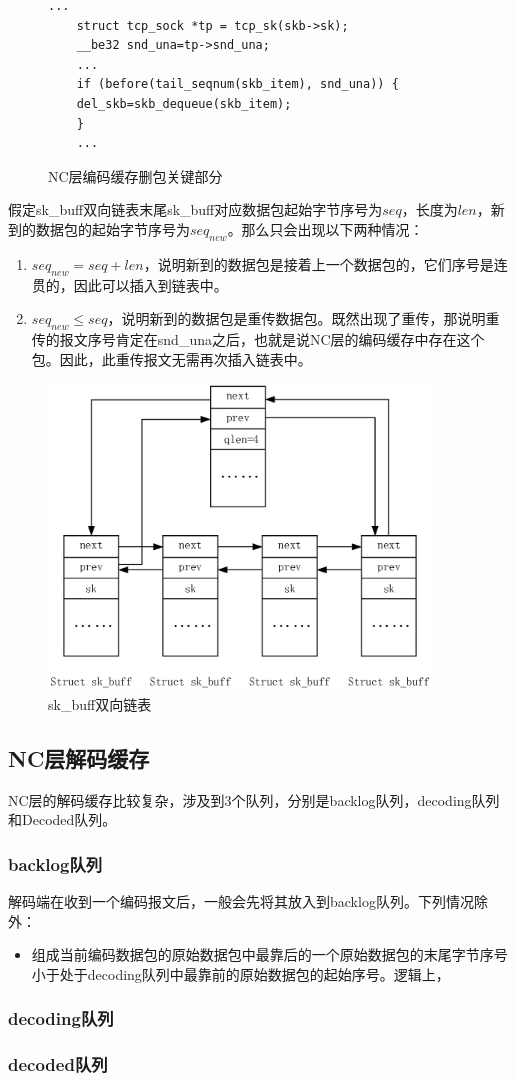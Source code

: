 \begin{figure}
	\begin{lstlisting}[language={[ANSI]C}]
	...
	struct tcp_sock *tp = tcp_sk(skb->sk);
	__be32 snd_una=tp->snd_una;
	...
	if (before(tail_seqnum(skb_item), snd_una)) {
	del_skb=skb_dequeue(skb_item);
	}
	...
	\end{lstlisting}
	\caption{NC层编码缓存删包关键部分}
	\label{NCDEL}
\end{figure}




\par
假定sk\_buff双向链表末尾sk\_buff对应数据包起始字节序号为$seq$，长度为$len$，新到的数据包的起始字节序号为$seq_{new}$。那么只会出现以下两种情况：
\begin{enumerate}[fullwidth,itemindent=2em,label=(\arabic*)]
	\item $seq_{new}=seq+len$，说明新到的数据包是接着上一个数据包的，它们序号是连贯的，因此可以插入到链表中。
	\item $seq_{new} \le seq$，说明新到的数据包是重传数据包。既然出现了重传，那说明重传的报文序号肯定在snd\_una之后，也就是说NC层的编码缓存中存在这个包。因此，此重传报文无需再次插入链表中。
\end{enumerate}
\begin{figure}[htbp]
	\centering
	\includegraphics[width=4in]{figures/skbufflink.eps}
	\caption{sk\_buff双向链表}
	\label{SKBUFFLINK_EPS}
\end{figure}
\subsection{NC层解码缓存}
NC层的解码缓存比较复杂，涉及到3个队列，分别是backlog队列，decoding队列和Decoded队列。
\subsubsection{\textbf{backlog队列}}
解码端在收到一个编码报文后，一般会先将其放入到backlog队列。下列情况除外：
\begin{itemize}[leftmargin=.5in]
	\item 组成当前编码数据包的原始数据包中最靠后的一个原始数据包的末尾字节序号小于处于decoding队列中最靠前的原始数据包的起始序号。逻辑上，
\end{itemize}
\subsubsection{\textbf{decoding队列}}
\subsubsection{\textbf{decoded队列}}
